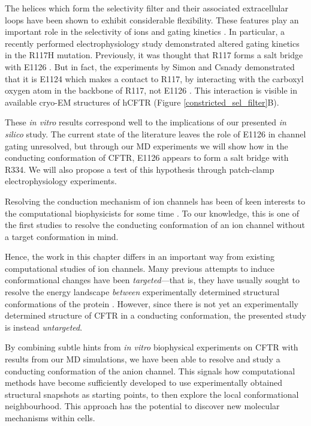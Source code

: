 The helices which form the selectivity filter and their associated extracellular loops have been shown to exhibit considerable flexibility. These features play an important role in the selectivity of ions and gating kinetics \cite{linsdell1998, kim2019, negoda2018, negoda2019}. In particular, a recently performed electrophysiology study demonstrated altered gating kinetics in the R117H mutation. Previously, it was thought that R117 forms a salt bridge with E1126 \cite{cui2014}. But in fact, the experiments by Simon and Csnady demonstrated that it is E1124 which makes a contact to R117, by interacting with the carboxyl oxygen atom in the backbone of R117, not E1126 \cite{simon2021}. This interaction is visible in available cryo-EM structures of hCFTR (Figure \ref{constricted_sel_filter}B). 

These \textit{in vitro} results correspond well to the implications of our presented \textit{in silico} study. The current state of the literature leaves the role of E1126 in channel gating unresolved, but through our MD experiments we will show how in the conducting conformation of CFTR, E1126 appears to form a salt bridge with R334. We will also propose a test of this hypothesis through patch-clamp electrophysiology experiments. 

Resolving the conduction mechanism of ion channels has been of keen interests to the computational biophysicists for some time \cite{black2020, flood2019}. To our knowledge, this is one of the first studies to resolve the conducting conformation of an ion channel without a target conformation in mind. 

Hence, the work in this chapter differs in an important way from existing computational studies of ion channels. Many previous attempts to induce conformational changes have been \textit{targeted}---that is, they have usually sought to resolve the energy landscape \textit{between} experimentally determined structural conformations of the protein \cite{hoffmann2018, lev2020, bergh2021, mccomas2022}. However, since there is not yet an experimentally determined structure of CFTR in a conducting conformation, the presented study is instead \textit{untargeted}. 

By combining subtle hints from \textit{in vitro} biophysical experiments on CFTR with results from our MD simulations, we have been able to resolve and study a conducting conformation of the anion channel. This signals how computational methods have become sufficiently developed to use experimentally obtained structural snapshots as starting points, to then explore the local conformational neighbourhood. This approach has the potential to discover new molecular mechanisms within cells.

